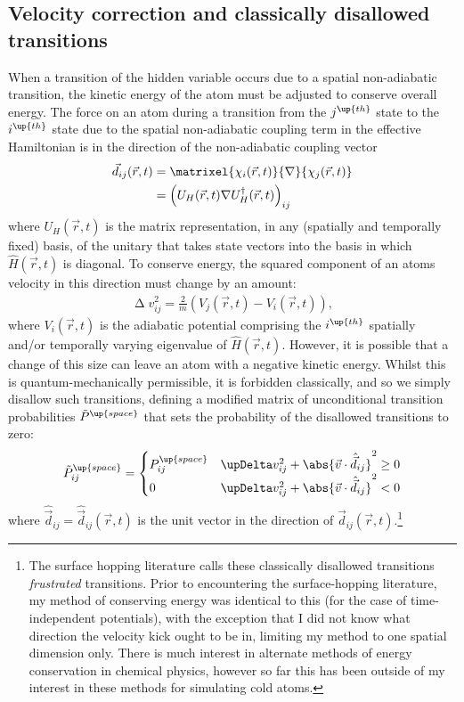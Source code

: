 \subsection{Velocity correction and classically disallowed transitions}\label{sec:velocity_correction}

When a transition of the hidden variable occurs due to a spatial non-adiabatic transition, the kinetic energy of the atom must be adjusted to conserve overall energy. The force on an atom during a transition from the $j^\up{th}$ state to the $i^\up{th}$ state due to the spatial non-adiabatic coupling term in the effective Hamiltonian is in the direction of the non-adiabatic coupling vector~\cite{doi:10.1146/annurev-physchem-040215-112245}
\begin{align}\label{eq:non_adiabatic_coupling_vector}
\vec d_{ij}(\vec r, t) &= \matrixel{\chi_i(\vec r, t)}{\nabla}{\chi_j(\vec r, t)}\\
&= \left(U_H(\vec r, t)\nabla U_H^\dagger(\vec r, t)\right)_{ij}
\end{align}
where $U_H(\vec r, t)$ is the matrix representation, in any (spatially and temporally fixed) basis, of the unitary that takes state vectors into the basis in which $\hat H(\vec r, t)$ is diagonal. To conserve energy, the squared component of an atoms velocity in this direction must change by an amount:
\begin{align}\label{eq:delta_v_squared}
\upDelta v_{ij}^2 = \frac2m\left(V_j(\vec r, t) - V_i(\vec r, t)\right),
\end{align}
where $V_i(\vec r, t)$ is the adiabatic potential comprising the $i^\up{th}$ spatially and/or temporally varying eigenvalue of $\hat H(\vec r, t)$. However, it is possible that a change of this size can leave an atom with a negative kinetic energy. Whilst this is quantum-mechanically permissible, it is forbidden classically, and so we simply disallow such transitions, defining a modified matrix of unconditional transition probabilities $\tilde P^\up{space}$ that sets the probability of the disallowed transitions to zero:
\begin{align}\label{eq:tilde_P_space}
\tilde P^\up{space}_{ij} =
\begin{cases}
P^\up{space}_{ij} & \upDelta v_{ij}^2 + \abs{\vec v\cdot\hat{\vec d}_{ij}}^2 \geq 0 \\
0 & \upDelta v_{ij}^2 + \abs{\vec v\cdot\hat{\vec d}_{ij}}^2 < 0
\end{cases}
\end{align}
where $\hat{\vec d}_{ij} = \hat{\vec d}_{ij}(\vec r, t)$ is the unit vector in the direction of $\vec d_{ij}(\vec r, t)$.\footnote{The surface hopping literature calls these classically disallowed transitions \emph{frustrated} transitions. Prior to encountering the surface-hopping literature, my method of conserving energy was identical to this (for the case of time-independent potentials), with the exception that I did not know what direction the velocity kick ought to be in, limiting my method to one spatial dimension only. There is much interest in alternate methods of energy conservation in chemical physics, however so far this has been outside of my interest in these methods for simulating cold atoms.}

